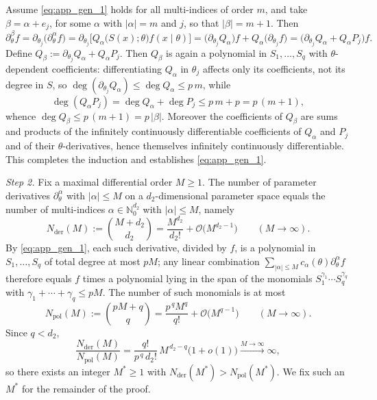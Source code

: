 \documentclass[11pt,twoside]{article} %
\begin{document}
Assume \eqref{eq:app_gen_1} holds for all multi-indices of order $m$, and take $\beta=\alpha+e_j$, for some $\alpha$ with $|\alpha| = m$ and $j$, so that 
$|\beta| = m+1$. Then
\begin{equation*}
    \partial^\beta_\theta f
    =\partial_{\theta_j}\big(\partial^\alpha_\theta f\big)
    =\partial_{\theta_j}\big[Q_\alpha\big(S(x);\theta\big)f(x\mid\theta)\big]
    =\Big(\partial_{\theta_j}Q_\alpha\Big)f+Q_\alpha\big(\partial_{\theta_j}f\big)
    =\big(\partial_{\theta_j}Q_\alpha+Q_\alpha P_j\big)f .
\end{equation*}
Define $Q_\beta:=\partial_{\theta_j}Q_\alpha+Q_\alpha P_j$. Then $Q_\beta$ is again a polynomial in
$S_1,\dots,S_q$ with $\theta$-dependent coefficients: differentiating $Q_\alpha$ in $\theta_j$ affects only its
coefficients, not its degree in $S$, so $\deg(\partial_{\theta_j}Q_\alpha)\le\deg Q_\alpha\le p\,m$, while
\begin{equation*}
    \deg(Q_\alpha P_j)=\deg Q_\alpha+\deg P_j\le p\,m+p=p\,(m+1),
\end{equation*}
whence $\deg Q_\beta\le p\,(m+1)=p\,|\beta|$. Moreover the coefficients of $Q_\beta$ are sums and products of
the infinitely continuously differentiable coefficients of $Q_\alpha$ and $P_j$ and of their $\theta$-derivatives, hence themselves
infinitely continuously differentiable. This completes the induction and establishes \eqref{eq:app_gen_1}.

\vspace{0.5 em}
\noindent
\emph{Step 2.}
Fix a maximal differential order $M\ge1$. The number of parameter derivatives $\partial^\alpha_\theta$ with
$|\alpha|\le M$ on a $d_2$-dimensional parameter space equals the number of multi-indices
$\alpha\in\mathbb N_0^{d_2}$ with $|\alpha|\le M$, namely
\begin{equation*}
    N_{\mathrm{der}}(M):=\binom{M+d_2}{d_2}=\frac{M^{d_2}}{d_2!}+\mathcal{O}\big(M^{d_2-1}\big)
    \qquad (M\to\infty).
\end{equation*}
By \eqref{eq:app_gen_1}, each such derivative, divided by $f$, is a polynomial in $S_1,\dots,S_q$ of total
degree at most $pM$; any linear combination $\sum_{|\alpha|\le M}c_\alpha(\theta)\partial^\alpha_\theta f$
therefore equals $f$ times a polynomial lying in the span of the monomials $S_1^{\gamma_1}\cdots S_q^{\gamma_q}$
with $\gamma_1+\cdots+\gamma_q\le pM$. The number of such monomials is at most
\begin{equation*}
    N_{\mathrm{pol}}(M):=\binom{pM+q}{q}=\frac{p^{\,q}M^{q}}{q!}+\mathcal{O}\big(M^{q-1}\big)
    \qquad (M\to\infty).
\end{equation*}
Since $q<d_2$,
\begin{equation*}
    \frac{N_{\mathrm{der}}(M)}{N_{\mathrm{pol}}(M)}
    =\frac{q!}{p^{\,q}\,d_2!}\,M^{\,d_2-q}\big(1+o(1)\big)\xrightarrow{M\to\infty}\infty,
\end{equation*}
so there exists an integer $M^*\ge1$ with $N_{\mathrm{der}}(M^*)>N_{\mathrm{pol}}(M^*)$. We fix such an $M^*$
for the remainder of the proof.
\end{document}
